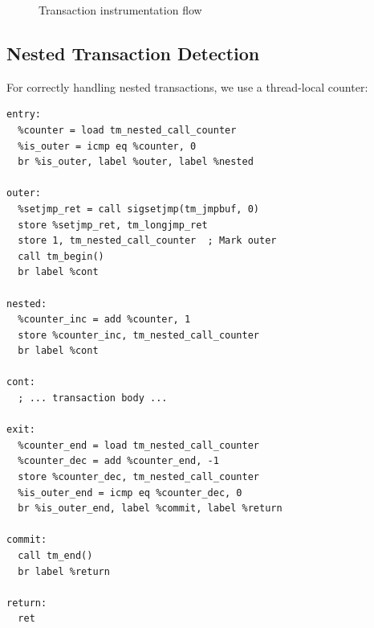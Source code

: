 \documentclass[article,12pt]{article}
\begin{document}
\begin{figure}[h]
\centering
{}
\caption{Transaction instrumentation flow}
\label{fig:flow}
\end{figure}

\subsection{Nested Transaction Detection}

For correctly handling nested transactions, we use a thread-local counter:

\begin{verbatim}
entry:
  %counter = load tm_nested_call_counter
  %is_outer = icmp eq %counter, 0
  br %is_outer, label %outer, label %nested

outer:
  %setjmp_ret = call sigsetjmp(tm_jmpbuf, 0)
  store %setjmp_ret, tm_longjmp_ret
  store 1, tm_nested_call_counter  ; Mark outer
  call tm_begin()
  br label %cont

nested:
  %counter_inc = add %counter, 1
  store %counter_inc, tm_nested_call_counter
  br label %cont

cont:
  ; ... transaction body ...

exit:
  %counter_end = load tm_nested_call_counter
  %counter_dec = add %counter_end, -1
  store %counter_dec, tm_nested_call_counter
  %is_outer_end = icmp eq %counter_dec, 0
  br %is_outer_end, label %commit, label %return

commit:
  call tm_end()
  br label %return

return:
  ret
\end{verbatim}
\end{document}
